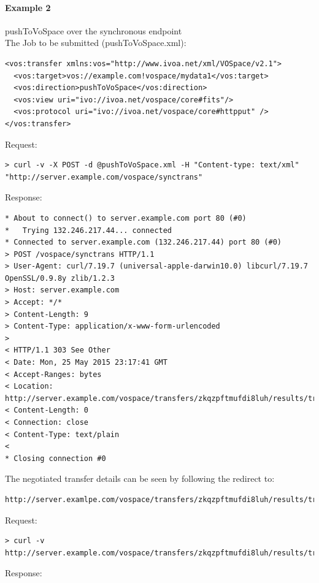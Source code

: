 \documentclass[11pt,a4paper]{ivoa}
\begin{document}
\paragraph{Example 2}
pushToVoSpace over the synchronous endpoint
\\[5px]
\noindent
The Job to be submitted (pushToVoSpace.xml):
\begin{lstlisting}
<vos:transfer xmlns:vos="http://www.ivoa.net/xml/VOSpace/v2.1">
  <vos:target>vos://example.com!vospace/mydata1</vos:target>
  <vos:direction>pushToVoSpace</vos:direction>
  <vos:view uri="ivo://ivoa.net/vospace/core#fits"/>
  <vos:protocol uri="ivo://ivoa.net/vospace/core#httpput" />
</vos:transfer>
\end{lstlisting}
Request:
\begin{lstlisting}
> curl -v -X POST -d @pushToVoSpace.xml -H "Content-type: text/xml" "http://server.example.com/vospace/synctrans"
\end{lstlisting}
Response:
\begin{lstlisting}
* About to connect() to server.example.com port 80 (#0)
*   Trying 132.246.217.44... connected
* Connected to server.example.com (132.246.217.44) port 80 (#0)
> POST /vospace/synctrans HTTP/1.1
> User-Agent: curl/7.19.7 (universal-apple-darwin10.0) libcurl/7.19.7 OpenSSL/0.9.8y zlib/1.2.3
> Host: server.example.com
> Accept: */*
> Content-Length: 9
> Content-Type: application/x-www-form-urlencoded
>
< HTTP/1.1 303 See Other
< Date: Mon, 25 May 2015 23:17:41 GMT
< Accept-Ranges: bytes
< Location: http://server.example.com/vospace/transfers/zkqzpftmufdi8luh/results/transferDetails
< Content-Length: 0
< Connection: close
< Content-Type: text/plain
<
* Closing connection #0
\end{lstlisting}
The negotiated transfer details can be seen by following the redirect to:
\begin{lstlisting}
http://server.examlpe.com/vospace/transfers/zkqzpftmufdi8luh/results/transferDetails
\end{lstlisting}
Request:
\begin{lstlisting}
> curl -v http://server.example.com/vospace/transfers/zkqzpftmufdi8luh/results/transferDetails
\end{lstlisting}
Response:
\end{document}
